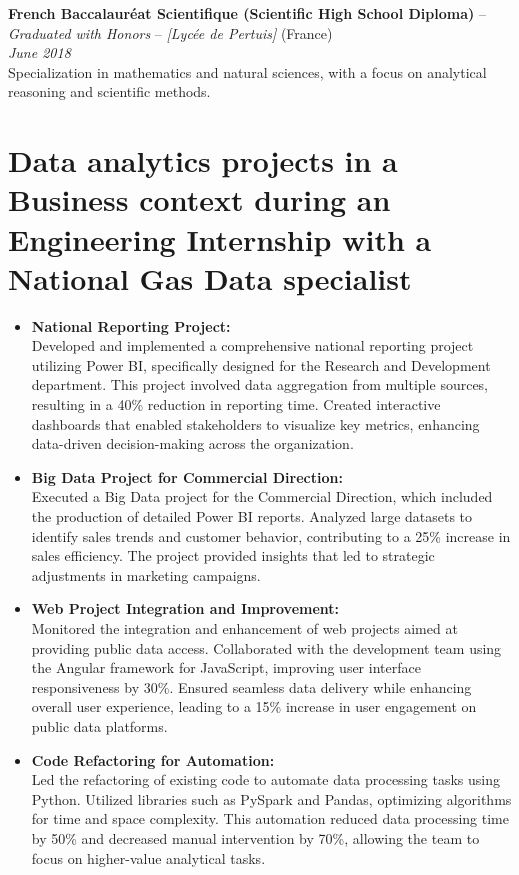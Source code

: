 \documentclass[10pt, letterpaper]{article}
\begin{document}
        \noindent
        \textbf{French Baccalauréat Scientifique (Scientific High School Diploma)} – \textit{Graduated with Honors} – \textit{[Lycée de Pertuis]} (France) \\
        \textit{June 2018} \\
        Specialization in mathematics and natural sciences, with a focus on analytical reasoning and scientific methods.

    \section{Data analytics projects in a Business context during an Engineering Internship with a National Gas Data specialist}
    \begin{itemize}

        \item \textbf{National Reporting Project:} \\
        Developed and implemented a comprehensive national reporting project utilizing Power BI, specifically designed for the Research and Development department. This project involved data aggregation from multiple sources, resulting in a 40\% reduction in reporting time. Created interactive dashboards that enabled stakeholders to visualize key metrics, enhancing data-driven decision-making across the organization.
    
        \item \textbf{Big Data Project for Commercial Direction:} \\
        Executed a Big Data project for the Commercial Direction, which included the production of detailed Power BI reports. Analyzed large datasets to identify sales trends and customer behavior, contributing to a 25\% increase in sales efficiency. The project provided insights that led to strategic adjustments in marketing campaigns.
    
        \item \textbf{Web Project Integration and Improvement:} \\
        Monitored the integration and enhancement of web projects aimed at providing public data access. Collaborated with the development team using the Angular framework for JavaScript, improving user interface responsiveness by 30\%. Ensured seamless data delivery while enhancing overall user experience, leading to a 15\% increase in user engagement on public data platforms.
    
        \item \textbf{Code Refactoring for Automation:} \\
        Led the refactoring of existing code to automate data processing tasks using Python. Utilized libraries such as PySpark and Pandas, optimizing algorithms for time and space complexity. This automation reduced data processing time by 50\% and decreased manual intervention by 70\%, allowing the team to focus on higher-value analytical tasks.
    
    \end{itemize}
\end{document}
